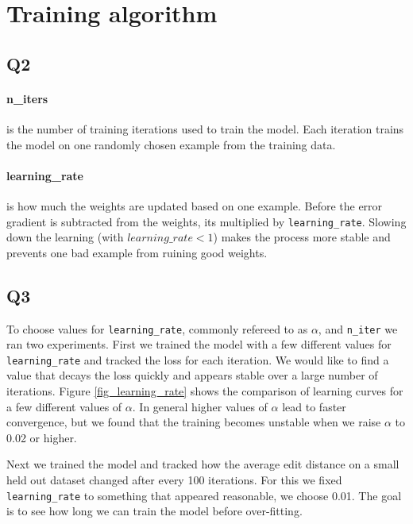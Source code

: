\documentclass[12pt]{article}
\begin{document}

\section{Training algorithm}

\subsection{Q2}

\paragraph{n\_iters} is the number of training iterations used to train the model. Each iteration trains the model on one randomly chosen example from the training data.

\paragraph{learning\_rate} is how much the weights are updated based on one example. Before the error gradient is subtracted from the weights, its multiplied by \texttt{learning\_rate}. Slowing down the learning (with $learning\_rate < 1$) makes the process more stable and prevents one bad example from ruining good weights.


\subsection{Q3}

To choose values for \texttt{learning\_rate}, commonly refereed to as $\alpha$, and \texttt{n\_iter} we ran two experiments. 
First we trained the model with a few different values for \texttt{learning\_rate} and tracked the loss for each iteration. We would like to find a value that decays the loss quickly and appears stable over a large number of iterations.
Figure \ref{fig_learning_rate} shows the comparison of learning curves for a few different values of $\alpha$. In general higher values of $\alpha$ lead to faster convergence, but we found that the training becomes unstable when we raise $\alpha$ to 0.02 or higher. 

Next we trained the model and tracked how the average edit distance on a small held out dataset changed after every 100 iterations. For this we fixed \texttt{learning\_rate} to something that appeared reasonable, we choose 0.01. The goal is to see how long we can train the model before over-fitting.
\end{document}
